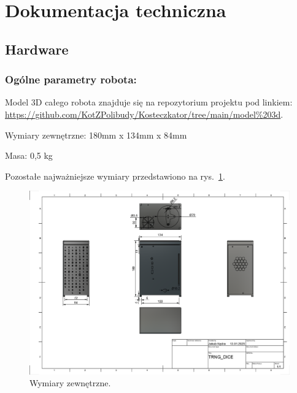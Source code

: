 \section{Dokumentacja techniczna}\label{sec:dokumentacja-techniczna}

\subsection{Hardware}
\label{subsec:hardware}
\subsubsection{Ogólne parametry robota:}
Model 3D całego robota znajduje się na repozytorium projektu pod linkiem: \url{https://github.com/KotZPolibudy/Kosteczkator/tree/main/model%203d}.

Wymiary zewnętrzne: 180mm x  134mm x 84mm

Masa: 0,5 kg

Pozostałe najważniejsze wymiary przedstawiono na rys.~\ref{fig:wymiary}.
\begin{figure}[H]
    \centering
    \includegraphics[width=0.95\linewidth]{chapters/03-praca-wlasna/figures/wymiary}
    \caption{\label{fig:wymiary}Wymiary zewnętrzne.}
\end{figure}

